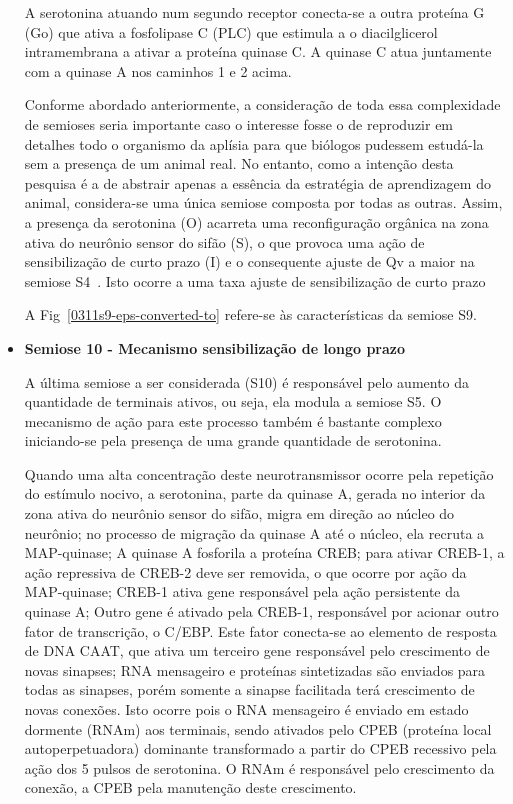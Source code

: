 \begin{itemize}

	A serotonina atuando num segundo receptor conecta-se a outra proteína G (Go) que ativa a fosfolipase C (PLC) que estimula a o diacilglicerol intramembrana a ativar a proteína quinase C. A quinase C atua juntamente com a quinase A nos caminhos 1 e 2 acima.

	Conforme abordado anteriormente, a consideração de toda essa complexidade de semioses seria importante caso o interesse fosse o de reproduzir em detalhes todo o organismo da aplísia para que biólogos pudessem estudá-la sem a presença de um animal real. No entanto, como a intenção desta pesquisa é a de abstrair apenas a essência da estratégia de aprendizagem do animal, considera-se uma única semiose composta por todas as outras. Assim, a presença da serotonina (O) acarreta uma reconfiguração orgânica na zona ativa do neurônio sensor do sifão (S), o que provoca uma ação de sensibilização de curto prazo (I) e o consequente ajuste de Qv a maior na semiose S4~\cite{kandel06,kandel00}. Isto ocorre a uma taxa ajuste de sensibilização de curto prazo

	A Fig~\ref{0311s9-eps-converted-to} refere-se às características da semiose S9.

	\item \textbf{Semiose 10 - Mecanismo sensibilização de longo prazo}

	A última semiose a ser considerada (S10) é responsável pelo aumento da quantidade de terminais ativos, ou seja, ela modula a semiose S5. O mecanismo de ação para este processo também é bastante complexo iniciando-se pela presença de uma grande quantidade de serotonina.


	Quando uma alta  concentração deste neurotransmissor ocorre pela repetição do estímulo nocivo, a serotonina, parte da quinase A, gerada no interior da zona ativa do neurônio sensor do sifão, migra em direção ao núcleo do neurônio; no processo de migração da quinase A até o núcleo, ela recruta a MAP-quinase; A quinase A fosforila a proteína CREB; para ativar CREB-1, a ação repressiva de CREB-2 deve ser removida, o que ocorre por ação da MAP-quinase; CREB-1 ativa gene responsável pela ação persistente da quinase A; Outro gene é ativado pela CREB-1, responsável por acionar outro fator de transcrição, o C/EBP. Este fator conecta-se ao elemento de resposta de DNA CAAT, que ativa um terceiro gene responsável pelo crescimento de novas sinapses; RNA mensageiro e proteínas sintetizadas são enviados para todas as sinapses, porém somente a sinapse facilitada terá crescimento de novas conexões. Isto ocorre pois o RNA mensageiro é enviado em estado dormente (RNAm) aos terminais, sendo ativados pelo CPEB (proteína local autoperpetuadora) dominante transformado a partir do CPEB recessivo pela ação dos 5 pulsos de serotonina. O RNAm é responsável pelo crescimento da conexão, a CPEB pela manutenção deste crescimento.


\end{itemize}

